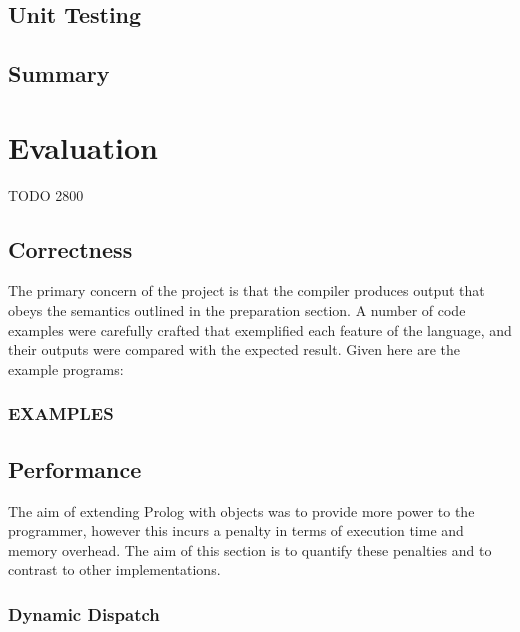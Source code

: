 \documentclass[12pt,a4paper,twoside,openright]{report}
\begin{document}
\section{Unit Testing}

\section{Summary}

\chapter{Evaluation}

TODO 2800

\section{Correctness}

The primary concern of the project is that the compiler produces output that obeys the semantics outlined in the preparation section. A number of code examples were carefully crafted that exemplified each feature of the language, and their outputs were compared with the expected result. Given here are the example programs:

\subsection{EXAMPLES}

\section{Performance}

The aim of extending Prolog with objects was to provide more power to the programmer, however this incurs a penalty in terms of execution time and memory overhead. The aim of this section is to quantify these penalties and to contrast to other implementations.

\subsection{Dynamic Dispatch}
\end{document}
